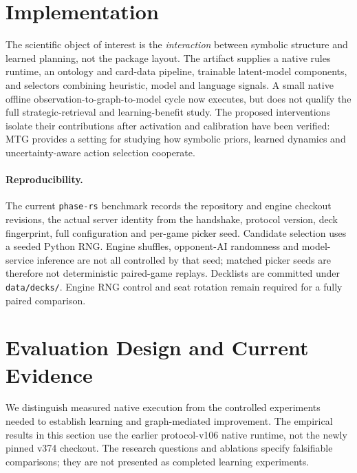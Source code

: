 \documentclass[11pt,a4paper]{article}
\theoremstyle{definition}
\theoremstyle{plain}
\begin{document}
\section{Implementation}
\label{sec:impl}

The scientific object of interest is the \emph{interaction} between symbolic structure and learned planning, not the package layout. The artifact supplies a native rules runtime, an ontology and card-data pipeline, trainable latent-model components, and selectors combining heuristic, model and language signals. A small native offline observation-to-graph-to-model cycle now executes, but does not qualify the full strategic-retrieval and learning-benefit study. The proposed interventions isolate their contributions after activation and calibration have been verified: MTG provides a setting for studying how symbolic priors, learned dynamics and uncertainty-aware action selection cooperate.

\paragraph{Reproducibility.} The current \texttt{phase-rs} benchmark records
the repository and engine checkout revisions, the actual server identity
from the handshake, protocol version, deck fingerprint, full configuration
and per-game picker seed. Candidate selection uses a seeded Python RNG.
Engine shuffles, opponent-AI randomness and model-service inference are not
all controlled by that seed; matched picker seeds are therefore not
deterministic paired-game replays. Decklists are committed under
\texttt{data/decks/}. Engine RNG control and seat rotation remain required
for a fully paired comparison.

\section{Evaluation Design and Current Evidence}
\label{sec:eval}

We distinguish measured native execution from the controlled experiments
needed to establish learning and graph-mediated improvement. The empirical
results in this section use the earlier protocol-v106 native runtime, not
the newly pinned v374 checkout. The research
questions and ablations specify falsifiable comparisons; they are not
presented as completed learning experiments.
\end{document}
